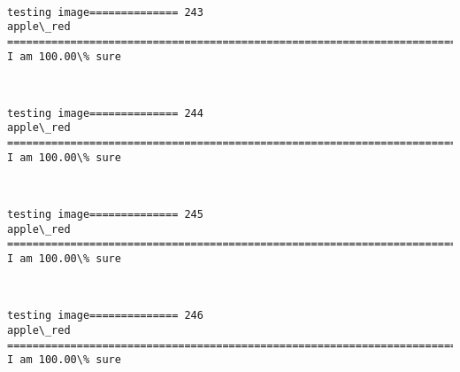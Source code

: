 \documentclass[11pt]{article}
\begin{document}
    \begin{center}
    \end{center}
    { \hspace*{\fill} \\}
    
    \begin{Verbatim}[commandchars=\\\{\}]
testing image============== 243
apple\_red
============================================================================
I am 100.00\% sure

    \end{Verbatim}

    \begin{center}
    \end{center}
    { \hspace*{\fill} \\}
    
    \begin{Verbatim}[commandchars=\\\{\}]
testing image============== 244
apple\_red
============================================================================
I am 100.00\% sure

    \end{Verbatim}

    \begin{center}
    \end{center}
    { \hspace*{\fill} \\}
    
    \begin{Verbatim}[commandchars=\\\{\}]
testing image============== 245
apple\_red
============================================================================
I am 100.00\% sure

    \end{Verbatim}

    \begin{center}
    \end{center}
    { \hspace*{\fill} \\}
    
    \begin{Verbatim}[commandchars=\\\{\}]
testing image============== 246
apple\_red
============================================================================
I am 100.00\% sure

    \end{Verbatim}
\end{document}
